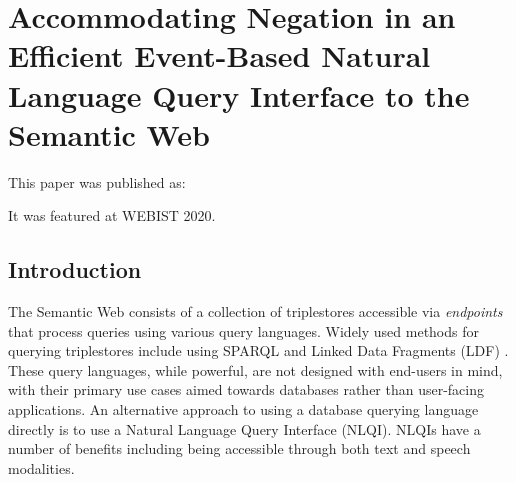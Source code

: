 \documentclass[../main.tex]{subfiles}
\begin{document}
\chapter{Accommodating Negation in an Efficient Event-Based Natural Language Query Interface to the Semantic Web}

\begin{refsection}

\label{chapter:webist2020conf}

This paper was published as:


It was featured at WEBIST 2020.


\section{Introduction}
\label{sec:introduction}


\noindent The Semantic Web consists of a collection of triplestores accessible via \textit{endpoints} that process queries using various query languages.  Widely used methods for querying triplestores include using SPARQL \cite{sparql} and Linked Data Fragments (LDF) \cite{verborgh2014web}.  These query languages, while powerful, are not designed with end-users in mind, with their primary use cases aimed towards databases rather than user-facing applications.
An alternative approach to using a database querying language directly is to use a Natural Language Query Interface (NLQI).  NLQIs have a number of benefits including being accessible through both text and speech modalities.


\end{refsection}
\end{document}
